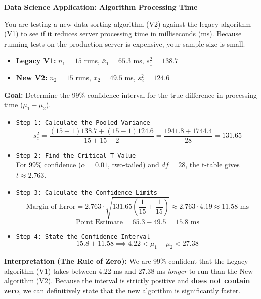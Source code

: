 \vspace{0.2cm}
\begin{example}{\textbf{Data Science Application: Algorithm Processing Time}}

You are testing a new data-sorting algorithm (V2) against the legacy algorithm (V1) to see if it reduces server processing time in milliseconds (ms). Because running tests on the production server is expensive, your sample size is small.

\begin{itemize}
    \item \textbf{Legacy V1:} $n_1 = 15$ runs, $\bar{x}_1 = 65.3$ ms, $s_1^2 = 138.7$
    \item \textbf{New V2:} $n_2 = 15$ runs, $\bar{x}_2 = 49.5$ ms, $s_2^2 = 124.6$
\end{itemize}

\textbf{Goal:} Determine the 99\% confidence interval for the true difference in processing time ($\mu_1 - \mu_2$).

\begin{itemize}
    \item \texttt{Step 1: Calculate the Pooled Variance}
    $$ s_{c}^{2} = \frac{(15-1)138.7 + (15-1)124.6}{15 + 15 - 2} = \frac{1941.8 + 1744.4}{28} = 131.65 $$
    
    \item \texttt{Step 2: Find the Critical T-Value} \\
    For 99\% confidence ($\alpha=0.01$, two-tailed) and $df = 28$, the t-table gives $t \approx 2.763$.
    
    \item \texttt{Step 3: Calculate the Confidence Limits}
    $$ \text{Margin of Error} = 2.763 \cdot \sqrt{131.65 \left(\frac{1}{15} + \frac{1}{15}\right)} \approx 2.763 \cdot 4.19 \approx 11.58 \text{ ms} $$
    $$ \text{Point Estimate} = 65.3 - 49.5 = 15.8 \text{ ms} $$
    
    \item \texttt{Step 4: State the Confidence Interval}
    $$ 15.8 \pm 11.58 \implies \boxed{4.22 < \mu_1 - \mu_2 < 27.38} $$
\end{itemize}

\textbf{Interpretation (The Rule of Zero):}
We are 99\% confident that the Legacy algorithm (V1) takes between 4.22 ms and 27.38 ms \textit{longer} to run than the New algorithm (V2). Because the interval is strictly positive and \textbf{does not contain zero}, we can definitively state that the new algorithm is significantly faster.
\end{example}

